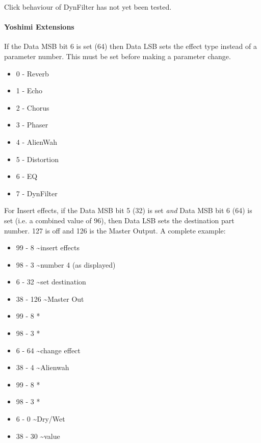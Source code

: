    Click behaviour of DynFilter has not yet been tested.

\paragraph{Yoshimi Extensions}

   If the Data MSB bit 6 is set (64) then Data LSB sets the effect type
   instead of a parameter number.  This must be set before making a parameter
   change.

   \begin{itemize}
      \item 0 - Reverb
      \item 1 - Echo
      \item 2 - Chorus
      \item 3 - Phaser
      \item 4 - AlienWah
      \item 5 - Distortion
      \item 6 - EQ
      \item 7 - DynFilter
   \end{itemize}

   For Insert effects, if the Data MSB bit 5 (32) is set
   \textsl{and} Data MSB bit 6 (64) is set (i.e. a combined value of 96),
   then Data LSB sets the destination part number.
   127 is off and 126 is the Master Output.
   A complete example:

   \begin{itemize}
      \item 99 -   8 \textasciitilde insert effects
      \item 98 -   3 \textasciitilde number 4 (as displayed)
      \item 6 -  32 \textasciitilde set destination
      \item 38 - 126 \textasciitilde Master Out
      \item 99 -   8  *
      \item 98 -   3  *
      \item 6 -  64 \textasciitilde change effect
      \item 38 -   4 \textasciitilde Alienwah
      \item 99 -   8  *
      \item 98 -   3  *
      \item 6 -   0 \textasciitilde Dry/Wet
      \item 38 -  30 \textasciitilde value
   \end{itemize}

